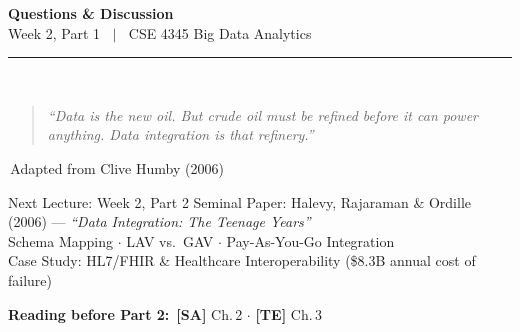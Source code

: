 \documentclass[aspectratio=169,10pt]{beamer}
\begin{document}
\begin{frame}[c]
  \begin{center}
    {\Large\bfseries Questions \& Discussion}\\[10pt]
    {\large Week 2, Part 1 $\;\mid\;$ CSE 4345 Big Data Analytics}\\[8pt]
    \textcolor{PUGray}{\rule{7cm}{0.5pt}}\\[10pt]
    \begin{quote}
      \itshape ``Data is the new oil.  But crude oil must be refined before it can power anything.
                 Data integration is that refinery.''
    \end{quote}
    \hfill\textemdash\,Adapted from Clive Humby (2006)
    \vspace{16pt}
    \begin{block}{\centering Next Lecture: Week 2, Part 2}
      \centering
      Seminal Paper: Halevy, Rajaraman \& Ordille (2006) — \textit{``Data Integration: The Teenage Years''}\\[4pt]
      \small Schema Mapping $\cdot$ LAV vs.\ GAV $\cdot$ Pay-As-You-Go Integration\\
      Case Study: HL7/FHIR \& Healthcare Interoperability (\$8.3B annual cost of failure)
    \end{block}
    \vspace{6pt}
    \textbf{Reading before Part 2:}\ \textbf{[SA]} Ch.\,2 $\cdot$ \textbf{[TE]} Ch.\,3
  \end{center}
\end{frame}

\end{document}
